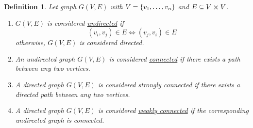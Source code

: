 \documentclass[]{article}
\numberwithin{equation}{section}
\newtheorem{definition}{Definition}
\begin{document}
\begin{definition} \label{def:graph_properties}
	Let graph $G(V,E)$ with $V = \qty{v_1,\dots,v_n}$ and $E \subseteq V \cross V$.
	\begin{enumerate}
		\item $G(V,E)$ is considered \underline{\emph{undirected}} if\[
			(v_i,v_j) \in E \iff (v_j,v_i) \in E
		\] otherwise, $G(V,E)$ is considered \emph{directed}.
		\item An undirected graph $G(V,E)$ is considered \underline{\emph{connected}} if there exists a path between any two vertices.
		\item A directed graph $G(V,E)$ is considered \underline{\emph{strongly connected}} if there exists a directed path between any two vertices.
		\item A directed graph $G(V,E)$ is considered \underline{\emph{weakly connected}} if the corresponding undirected graph is connected.
	\end{enumerate}
\end{definition}
\end{document}
